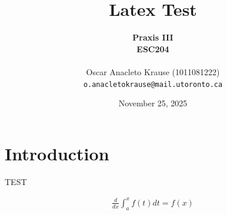 \documentclass[12pt, letterpaper]{article}
\title{
 \textbf{Latex Test}
}
\author{
 \large{\textbf{Praxis III}} \\
 \large{\textbf{ESC204}} \\
 \\
 Oscar Anacleto Krause (1011081222) \\ 
 \vspace{0.9em}
 \texttt{o.anacletokrause@mail.utoronto.ca} \\
}
\date{November 25, 2025}
\begin{document}
 \maketitle
 \newpage

\newpage


\section{Introduction} \label{intro}

TEST

\newpage

\appendix
\renewcommand{\thesection}{Appendix~\Alph{section}}
\renewcommand{\thetable}{A\arabic{table}} %
\setcounter{table}{0}                     %

\nocite{*}
\begin{align}
  \frac{d}{dx}\int_{a}^{x}f(t)dt = f(x)
\end{align}
  
\newpage

\end{document}
